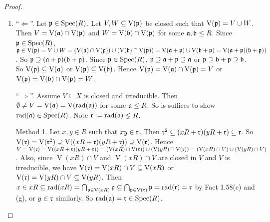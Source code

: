 \begin{proof}
    \begin{enumerate}
        \item ``$\Leftarrow$''. Let $\mathfrak{p} \in \operatorname{Spec}(R)$. Let $V,W \subseteq \operatorname{V}(\mathfrak{p})$ be closed such that $\operatorname{V}(\mathfrak{p}) = V \cup W$. Then $V = \operatorname{V}(\mathfrak{a}) \cap \operatorname{V}(\mathfrak{p})$ and $W = \operatorname{V}(\mathfrak{b}) \cap \operatorname{V}(\mathfrak{p})$ for some $\mathfrak{a},\mathfrak{b} \leq R$. Since $\mathfrak{p} \in \operatorname{Spec}(R)$, $\mathfrak{p} \in \operatorname{V}(\mathfrak{p}) = V \cup W = (\operatorname{V}(\mathfrak{a}) \cap \operatorname{V}(\mathfrak{p})) \cup (\operatorname{V}(\mathfrak{b}) \cap \operatorname{V}(\mathfrak{p})) = \operatorname{V}(\mathfrak{a} + \mathfrak{p}) \cup \operatorname{V}(\mathfrak{b} + \mathfrak{p})= \operatorname{V}(\mathfrak{a} + \mathfrak{p})(\mathfrak{b}+\mathfrak{p}))$. So $\mathfrak{p} \supseteq (\mathfrak{a} + \mathfrak{p})(\mathfrak{b} + \mathfrak{p})$. Since $\mathfrak{p} \in \operatorname{Spec}(R)$, $\mathfrak{p} \supseteq \mathfrak{a} + \mathfrak{p} \supseteq \mathfrak{a}$ or $\mathfrak{p} \supseteq \mathfrak{b} + \mathfrak{p} \supseteq \mathfrak{b}$. So $\operatorname{V}(\mathfrak{p}) \subseteq \operatorname{V}(\mathfrak{a})$ or $\operatorname{V}(\mathfrak{p}) \subseteq \operatorname{V}(\mathfrak{b})$. Hence $\operatorname{V}(\mathfrak{p}) = \operatorname{V}(\mathfrak{a}) \cap \operatorname{V}(\mathfrak{p}) = V$ or $\operatorname{V}(\mathfrak{p}) = \operatorname{V}(\mathfrak{b}) \cap \operatorname{V}(\mathfrak{p}) = W$. \par
        ``$\Rightarrow$''. Assume $V \subseteq X$ is closed and irreducible. Then $\emptyset \neq V = \operatorname{V}(\mathfrak{a}) = \operatorname{V}(\operatorname{rad}(\mathfrak{a})) $ for some $\mathfrak{a} \leq R$. So is suffices to show $\operatorname{rad}(\mathfrak{a}) \in \operatorname{Spec}(R)$. Note $\mathfrak{r} := \operatorname{rad}(\mathfrak{a}) \lneq R$. \par 
        Method 1. Let $x,y \in R$ such that $xy \in \mathfrak{r}$. Then $\mathfrak{r}^2 \subseteq (xR+\mathfrak{r})(yR+\mathfrak{r}) \subseteq \mathfrak{r}$. So $\operatorname{V}(\mathfrak{r}) = \operatorname{V}(\mathfrak{r}^2) \supseteq \operatorname{V}((xR+\mathfrak{r})(yR+\mathfrak{r})) \supseteq \operatorname{V}(\mathfrak{r})$. Hence $V = \operatorname{V}(\mathfrak{r}) = \operatorname{V}((xR + \mathfrak{r})(yR+\mathfrak{r})) = (\operatorname{V}(xR) \cap \operatorname{V}(\mathfrak{r})) \cup (\operatorname{V}(yR) \cap \operatorname{V}(\mathfrak{r})) = (\operatorname{V}(xR) \cap V) \cup (\operatorname{V}(yR) \cap V)$. Also, since $\operatorname{V}(xR) \cap V$ and $\operatorname{V}(xR) \cap V$ are closed in $V$ and $V$ is irreducible, we have $\operatorname{V}(\mathfrak{r}) = \operatorname{V}(xR) \cap V \subseteq \operatorname{V}(xR)$ or $\operatorname{V}(\mathfrak{r}) = \operatorname{V}(yR) \cap V \subseteq \operatorname{V}(yR)$. Then $x \in xR \subseteq \operatorname{rad}(xR) = \bigcap_{\mathfrak{p} \in \operatorname{V}(xR)} \mathfrak{p} \subseteq \bigcap_{\mathfrak{p} \in \operatorname{V}(\mathfrak{r})} \mathfrak{p} = \operatorname{rad}(\mathfrak{r}) = \mathfrak{r}$ by Fact 1.58(c) and (g), or $y \in \mathfrak{r}$ similarly. So $\operatorname{rad}(\mathfrak{a}) = \mathfrak{r} \in \operatorname{Spec}(R)$. \par 

\end{enumerate}
\end{proof}
